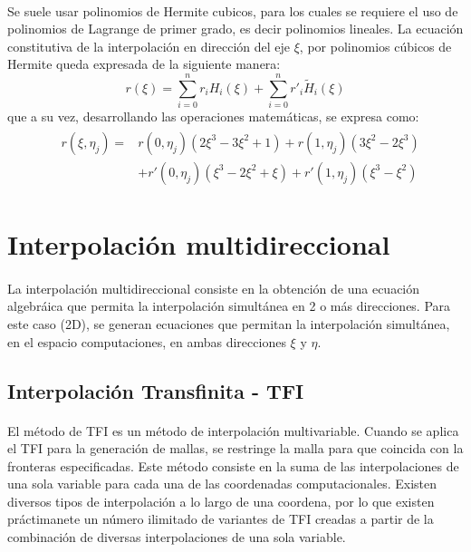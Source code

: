 \documentclass[letterpaper, openright, 12pt]{book}
\begin{document}
			\paragraph*{}
				Se suele usar polinomios de Hermite cubicos, para los cuales se requiere el uso de polinomios de Lagrange de primer grado, es decir polinomios lineales. La ecuación constitutiva de la interpolación en dirección del eje $\xi$, por polinomios cúbicos de Hermite queda expresada de la siguiente manera:
				\begin{equation}
					r(\xi) = \sum_{i = 0}^{n} r_{i}H_{i}(\xi) + \sum_{i = 0}^{n} r\prime_{i}\widetilde{H}_{i}(\xi)
				\end{equation}
				que a su vez, desarrollando las operaciones matemáticas, se expresa como:
				\begin{align}
					&\begin{aligned}
						r(\xi, \eta_{j}) =& r(0, \eta_{j})(2\xi^3 - 3\xi^2 +1) + r(1, \eta_{j})(3\xi^2 - 2\xi^3) \\ &+ r\prime(0, \eta_{j})(\xi^3 - 2\xi^2 + \xi) + r\prime(1, \eta_{j})(\xi^3 - \xi^2)
					\end{aligned}
				\end{align}
				
	\section{Interpolación multidireccional}
		\paragraph*{}
			La interpolación multidireccional consiste en la obtención de una ecuación algebráica que permita la interpolación simultánea en 2 o más direcciones. Para este caso (2D), se generan ecuaciones que permitan la interpolación simultánea, en el espacio computaciones, en ambas direcciones $\xi$ y $\eta$.
		\subsection{Interpolación Transfinita - TFI}
			\paragraph*{}
				El método de TFI es un método de interpolación multivariable. Cuando se aplica el TFI para la generación de mallas, se restringe la malla para que coincida con la fronteras especificadas. Este método consiste en la suma de las interpolaciones de una sola variable para cada una de las coordenadas computacionales. Existen diversos tipos de interpolación a lo largo de una coordena, por lo que existen práctimanete un número ilimitado de variantes de TFI creadas a partir de la combinación de diversas interpolaciones de una sola variable.\cite{thompsonhandbook}
\end{document}
